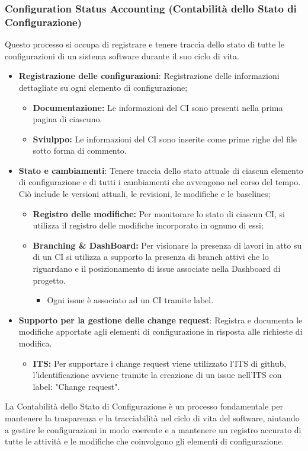 \subsubsection{Configuration Status Accounting (Contabilità dello Stato di Configurazione)}
Questo processo si occupa di registrare e tenere traccia dello stato di tutte le configurazioni di un sistema software durante il suo ciclo di vita.
\begin{itemize}
    \item \textbf{Registrazione delle configurazioni}: Registrazione delle informazioni dettagliate su ogni elemento di configurazione;
          \begin{itemize}
              \item  \textbf{Documentazione:} Le informazioni del CI sono presenti nella prima pagina di ciascuno.
              \item  \textbf{Sviulppo:} Le informazioni del CI sono inserite come prime righe del file sotto forma di commento.
          \end{itemize}
    \item \textbf{Stato e cambiamenti}: Tenere traccia dello stato attuale di ciascun elemento di configurazione e di tutti i cambiamenti che avvengono nel corso del tempo. Ciò include le versioni attuali, le revisioni, le modifiche e le baselines;
          \begin{itemize}
              \item  \textbf{Registro delle modifiche:} Per monitorare lo stato di ciascun CI, si utilizza il registro delle modifiche incorporato in ognuno di essi;
              \item  \textbf{Branching \& DashBoard:} Per visionare la presenza di lavori in atto su di un CI si utilizza a supporto la presenza di branch attivi che lo riguardano e il posizionamento di issue associate nella Dashboard di progetto.
                    \begin{itemize}
                        \item Ogni issue è associato ad un CI tramite label.  \label{sec:ticketing}
                    \end{itemize}
          \end{itemize}
    \item \textbf{Supporto per la gestione delle change request}: Registra e documenta le modifiche apportate agli elementi di configurazione in risposta alle richieste di modifica.
          \begin{itemize}
              \item  \textbf{ITS:} Per supportare i change request viene utilizzato l'ITS di github, l'identificazione avviene tramite la creazione di un issue nell'ITS con label: "Change request".
          \end{itemize}
\end{itemize}
La Contabilità dello Stato di Configurazione è un processo fondamentale per mantenere la trasparenza e la tracciabilità nel ciclo di vita del software, aiutando a gestire le configurazioni in modo coerente e a mantenere un registro accurato di tutte le attività e le modifiche che coinvolgono gli elementi di configurazione.\\
\vspace{0.2cm}

